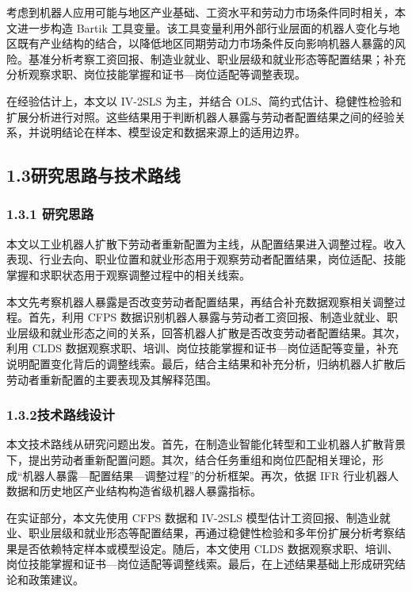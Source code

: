 考虑到机器人应用可能与地区产业基础、工资水平和劳动力市场条件同时相关，本文进一步构造 Bartik 工具变量。该工具变量利用外部行业层面的机器人变化与地区既有产业结构的结合，以降低地区同期劳动力市场条件反向影响机器人暴露的风险。基准分析考察工资回报、制造业就业、职业层级和就业形态等配置结果；补充分析观察求职、岗位技能掌握和证书---岗位适配等调整表现。

在经验估计上，本文以 IV-2SLS 为主，并结合 OLS、简约式估计、稳健性检验和扩展分析进行对照。这些结果用于判断机器人暴露与劳动者配置结果之间的经验关系，并说明结论在样本、模型设定和数据来源上的适用边界。

\subsection{1.3研究思路与技术路线}\label{ux7814ux7a76ux601dux8defux4e0eux6280ux672fux8defux7ebf}

\subsubsection{1.3.1 研究思路}\label{ux7814ux7a76ux601dux8def}

本文以工业机器人扩散下劳动者重新配置为主线，从配置结果进入调整过程。收入表现、行业去向、职业位置和就业形态用于观察劳动者配置结果，岗位适配、技能掌握和求职状态用于观察调整过程中的相关线索。

本文先考察机器人暴露是否改变劳动者配置结果，再结合补充数据观察相关调整过程。首先，利用 CFPS 数据识别机器人暴露与劳动者工资回报、制造业就业、职业层级和就业形态之间的关系，回答机器人扩散是否改变劳动者配置结果。其次，利用 CLDS 数据观察求职、培训、岗位技能掌握和证书---岗位适配等变量，补充说明配置变化背后的调整线索。最后，结合主结果和补充分析，归纳机器人扩散后劳动者重新配置的主要表现及其解释范围。

\subsubsection{1.3.2技术路线设计}\label{ux6280ux672fux8defux7ebfux8bbeux8ba1}

本文技术路线从研究问题出发。首先，在制造业智能化转型和工业机器人扩散背景下，提出劳动者重新配置问题。其次，结合任务重组和岗位匹配相关理论，形成``机器人暴露---配置结果---调整过程''的分析框架。再次，依据 IFR 行业机器人数据和历史地区产业结构构造省级机器人暴露指标。

在实证部分，本文先使用 CFPS 数据和 IV-2SLS 模型估计工资回报、制造业就业、职业层级和就业形态等配置结果，再通过稳健性检验和多年份扩展分析考察结果是否依赖特定样本或模型设定。随后，本文使用 CLDS 数据观察求职、培训、岗位技能掌握和证书---岗位适配等调整线索。最后，在上述结果基础上形成研究结论和政策建议。

